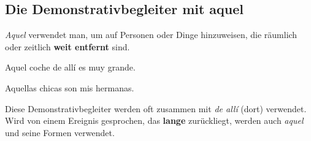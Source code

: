 \subsection*{Die Demonstrativbegleiter mit aquel}
\textit{Aquel} verwendet man, um auf Personen oder Dinge 
hinzuweisen, die räumlich oder zeitlich \textbf{weit entfernt}
sind.
\begin{ejemplos}
    \item Aquel coche de all\'i es muy grande.
    \item Aquellas chicas son mis hermanas.
\end{ejemplos}
Diese Demonstrativbegleiter werden oft zusammen mit
\textit{de all\'i} (dort) verwendet. Wird von einem
Ereignis gesprochen, das \textbf{lange} zurückliegt,
werden auch \textit{aquel} und seine Formen verwendet.

